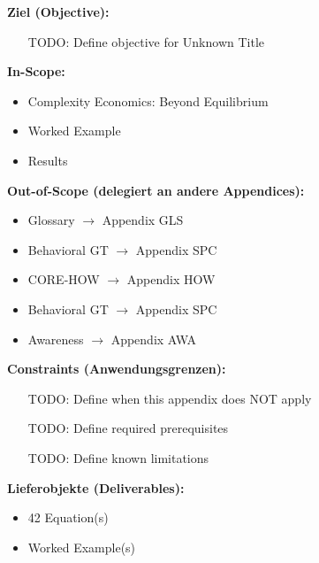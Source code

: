 
\begin{tcolorbox}[
    colback=orange!5!white,
    colframe=orange!75!black,
    title={\textbf{Appendix Scope: Ziel / In-Scope / Out-of-Scope / Constraints}},
    fonttitle=\bfseries
]

\textbf{Ziel (Objective):}
\begin{itemize}[nosep]
    \item [TODO: Define objective for Unknown Title]
\end{itemize}

\textbf{In-Scope:}
\begin{itemize}[nosep]
    \item Complexity Economics: Beyond Equilibrium
    \item Worked Example
    \item Results
\end{itemize}

\textbf{Out-of-Scope (delegiert an andere Appendices):}
\begin{itemize}[nosep]
    \item Glossary $\rightarrow$ Appendix GLS
    \item Behavioral GT $\rightarrow$ Appendix SPC
    \item CORE-HOW $\rightarrow$ Appendix HOW
    \item Behavioral GT $\rightarrow$ Appendix SPC
    \item Awareness $\rightarrow$ Appendix AWA
\end{itemize}

\textbf{Constraints (Anwendungsgrenzen):}
\begin{itemize}[nosep]
    \item [TODO: Define when this appendix does NOT apply]
    \item [TODO: Define required prerequisites]
    \item [TODO: Define known limitations]
\end{itemize}

\textbf{Lieferobjekte (Deliverables):}
\begin{itemize}[nosep]
    \item 42 Equation(s)
    \item Worked Example(s)
\end{itemize}

\end{tcolorbox}



